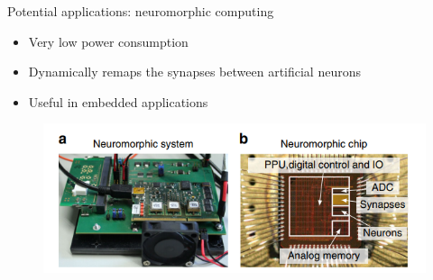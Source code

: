 \documentclass[aspectratio=169]{beamer}
\begin{document}
\begin{frame}{Potential applications: neuromorphic computing}

\begin{itemize}
\item Very low power consumption
\item Dynamically remaps the synapses between artificial neurons
\item Useful in embedded applications
\end{itemize}


\begin{figure}
\centering
\includegraphics[width=130mm]{figure-26}
\end{figure}


\end{frame}
\end{document}
